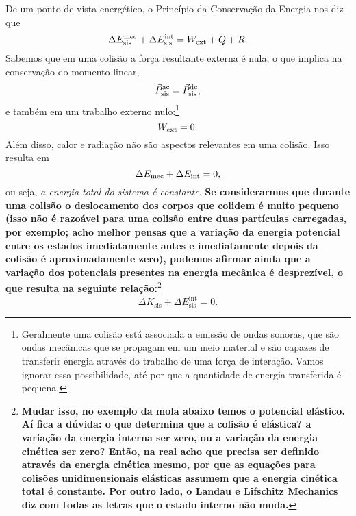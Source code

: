 De um ponto de vista energético, o Princípio da Conservação da Energia nos diz que
\begin{equation}
    \Delta E_{\text{sis}}^{\rm{mec}} + \Delta E_{\rm{sis}}^{\text{int}} = W_{\rm{ext}} + Q + R.
\end{equation}
%
Sabemos que em uma colisão a força resultante externa é nula, o que implica na conservação do momento linear,
\begin{equation}
    \vec{P}_{\rm{sis}}^{\rm{ac}} = \vec{P}_{\rm{sis}}^{\rm{dc}},
\end{equation}
%
e também em um trabalho externo nulo:\footnote{Geralmente uma colisão está associada a emissão de ondas sonoras, que são ondas mecânicas que se propagam em um meio material e são capazes de transferir energia através do trabalho de uma força de interação. Vamos ignorar essa possibilidade, até por que a quantidade de energia transferida é pequena.}
\begin{equation}
    W_{\rm{ext}} = 0.
\end{equation}
%
Além disso, calor e radiação não são aspectos relevantes em uma colisão. Isso resulta em
\begin{equation}\label{Eq:ConsEnergiaEmColisao}
    \Delta E_{\rm{mec}} + \Delta E_{\rm{int}} = 0,
\end{equation}
%
ou seja, \emph{a energia total do sistema é constante}. \textbf{Se considerarmos que durante uma colisão o deslocamento dos corpos que colidem é muito pequeno (isso não é razoável para uma colisão entre duas partículas carregadas, por exemplo; acho melhor pensas que a variação da energia potencial entre os estados imediatamente antes e imediatamente depois da colisão é aproximadamente zero), podemos afirmar ainda que a variação dos potenciais presentes na energia mecânica é desprezível, o que resulta na seguinte relação:}\footnote{\textbf{Mudar isso, no exemplo da mola abaixo temos o potencial elástico. Aí fica a dúvida: o que determina que a colisão é elástica? a variação da energia interna ser zero, ou a variação da energia cinética ser zero? Então, na real acho que precisa ser definido através da energia cinética mesmo, por que as equações para colisões unidimensionais elásticas assumem que a energia cinética total é constante. Por outro lado, o Landau e Lifschitz Mechanics diz com todas as letras que o estado interno não muda.}}
\begin{equation}
    \Delta K_{\text{sis}} + \Delta E_{\text{sis}}^{\text{int}} = 0.
\end{equation}

